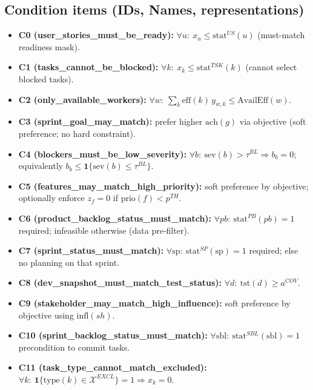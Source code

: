 \documentclass[11pt,a4paper]{article}
\begin{document}
\subsection*{Condition items (IDs, Names, representations)}
\begin{itemize}[leftmargin=2em]
  \item \textbf{C0 (user\_stories\_must\_be\_ready):} $\forall u:\ x_u \le \text{stat}^{US}(u)$ (must-match readiness mask).
  \item \textbf{C1 (tasks\_cannot\_be\_blocked):} $\forall k:\ x_k \le \text{stat}^{TSK}(k)$ (cannot select blocked tasks).
  \item \textbf{C2 (only\_available\_workers):} $\forall w:\ \sum_{k} \text{eff}(k)\,y_{w,k} \le \text{AvailEff}(w)$.
  \item \textbf{C3 (sprint\_goal\_may\_match):} prefer higher $\text{ach}(g)$ via objective (soft preference; no hard constraint).
  \item \textbf{C4 (blockers\_must\_be\_low\_severity):} $\forall b:\ \text{sev}(b) > \tau^{BL} \Rightarrow b_b = 0$; equivalently $b_b \le \mathbf{1}\{\text{sev}(b)\le \tau^{BL}\}$.
  \item \textbf{C5 (features\_may\_match\_high\_priority):} soft preference by objective; optionally enforce $z_f = 0$ if $\text{prio}(f) < p^{TH}$.
  \item \textbf{C6 (product\_backlog\_status\_must\_match):} $\forall pb:\ \text{stat}^{PB}(pb)=1$ required; infeasible otherwise (data pre-filter).
  \item \textbf{C7 (sprint\_status\_must\_match):} $\forall \mathrm{sp}:\ \text{stat}^{SP}(\mathrm{sp})=1$ required; else no planning on that sprint.
  \item \textbf{C8 (dev\_snapshot\_must\_match\_test\_status):} $\forall d:\ \text{tst}(d) \ge a^{COV}$.
  \item \textbf{C9 (stakeholder\_may\_match\_high\_influence):} soft preference by objective using $\text{infl}(sh)$.
  \item \textbf{C10 (sprint\_backlog\_status\_must\_match):} $\forall \mathrm{sbl}:\ \text{stat}^{SBL}(\mathrm{sbl})=1$ precondition to commit tasks.
  \item \textbf{C11 (task\_type\_cannot\_match\_excluded):} $\forall k:\ \mathbf{1}\{\text{type}(k)\in\mathcal{X}^{EXCL}\}=1 \Rightarrow x_k=0$.
\end{itemize}
\end{document}
